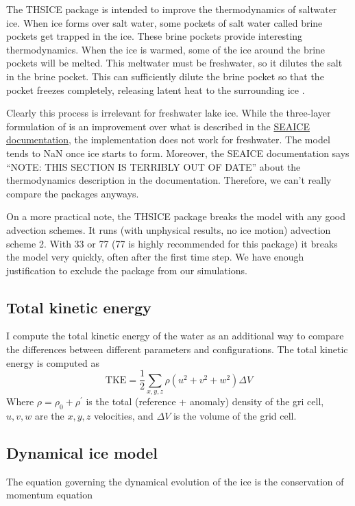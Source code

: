 \documentclass[11pt]{article}
\begin{document}
The THSICE package is intended to improve the thermodynamics of saltwater ice. When ice forms over salt water, some pockets of salt water called brine pockets get trapped in the ice. These brine pockets provide interesting thermodynamics. When the ice is warmed, some of the ice around the brine pockets will be melted. This meltwater must be freshwater, so it dilutes the salt in the brine pocket. This can sufficiently dilute the brine pocket so that the pocket freezes completely, releasing latent heat to the surrounding ice \cite{Winton2000}.

Clearly this process is irrelevant for freshwater lake ice. While the three-layer formulation of \cite{Winton2000} is an improvement over what is described in the \href{http://mitgcm.org/public/r2_manual/final/online_documents/node254.html}{SEAICE documentation}, the implementation does not work for freshwater. The model tends to NaN once ice starts to form. Moreover, the SEAICE documentation says ``NOTE: THIS SECTION IS TERRIBLY OUT OF DATE'' about the thermodynamics description in the documentation. Therefore, we can't really compare the packages anyways.

On a more practical note, the THSICE package breaks the model with any good advection schemes. It runs (with unphysical results, no ice motion) advection scheme 2. With 33 or 77 (77 is highly recommended for this package) it breaks the model very quickly, often after the first time step. We have enough justification to exclude the package from our simulations.

\subsection{Total kinetic energy}
I compute the total kinetic energy of the water as an additional way to compare the differences between different parameters and configurations. The total kinetic energy is computed as
\begin{equation}
\textrm{TKE} = \frac{1}{2} \sum_{x, y, z} \rho \left ( u^2 + v^2 + w^2\right ) \Delta V
\end{equation}
Where $\rho = \rho_0 + \rho^{\prime}$ is the total (reference + anomaly) density of the gri cell, $u, v, w$ are the $x, y, z$ velocities, and $\Delta V$ is the volume of the grid cell.

\subsection{Dynamical ice model}
\label{sec:iceDynamics}
The equation governing the dynamical evolution of the ice is the conservation of momentum equation
\end{document}

